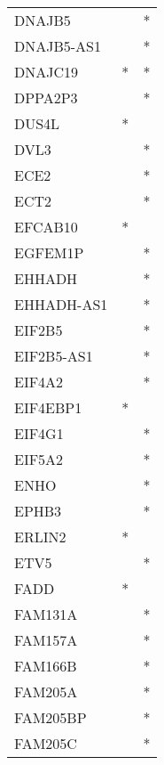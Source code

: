 \begin{longtable}{lcc}
DNAJB5           &                &          * \\
DNAJB5-AS1       &                &          * \\
DNAJC19          &              * &          * \\
DPPA2P3          &                &          * \\
DUS4L            &              * &            \\
DVL3             &                &          * \\
ECE2             &                &          * \\
ECT2             &                &          * \\
EFCAB10          &              * &            \\
EGFEM1P          &                &          * \\
EHHADH           &                &          * \\
EHHADH-AS1       &                &          * \\
EIF2B5           &                &          * \\
EIF2B5-AS1       &                &          * \\
EIF4A2           &                &          * \\
EIF4EBP1         &              * &            \\
EIF4G1           &                &          * \\
EIF5A2           &                &          * \\
ENHO             &                &          * \\
EPHB3            &                &          * \\
ERLIN2           &              * &            \\
ETV5             &                &          * \\
FADD             &              * &            \\
FAM131A          &                &          * \\
FAM157A          &                &          * \\
FAM166B          &                &          * \\
FAM205A          &                &          * \\
FAM205BP         &                &          * \\
FAM205C          &                &          * \\

\end{longtable}
